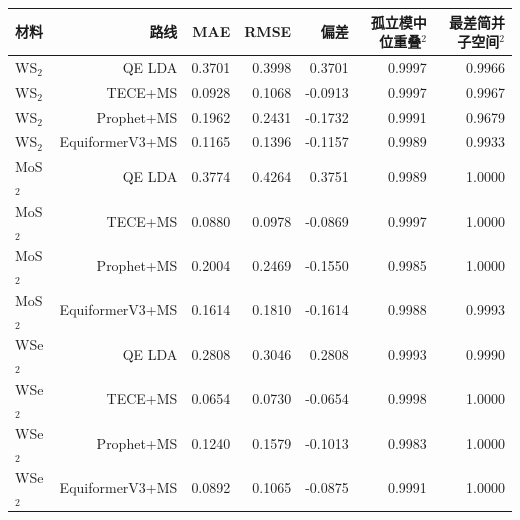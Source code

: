\begin{tabular}{lrrrrrr}
\toprule
材料 & 路线 & MAE & RMSE & 偏差 & 孤立模中位重叠$^2$ & 最差简并子空间$^2$ \\
\midrule
WS$_2$ & QE LDA & 0.3701 & 0.3998 & 0.3701 & 0.9997 & 0.9966 \\
WS$_2$ & TECE+MS & 0.0928 & 0.1068 & -0.0913 & 0.9997 & 0.9967 \\
WS$_2$ & Prophet+MS & 0.1962 & 0.2431 & -0.1732 & 0.9991 & 0.9679 \\
WS$_2$ & EquiformerV3+MS & 0.1165 & 0.1396 & -0.1157 & 0.9989 & 0.9933 \\
MoS$_2$ & QE LDA & 0.3774 & 0.4264 & 0.3751 & 0.9989 & 1.0000 \\
MoS$_2$ & TECE+MS & 0.0880 & 0.0978 & -0.0869 & 0.9997 & 1.0000 \\
MoS$_2$ & Prophet+MS & 0.2004 & 0.2469 & -0.1550 & 0.9985 & 1.0000 \\
MoS$_2$ & EquiformerV3+MS & 0.1614 & 0.1810 & -0.1614 & 0.9988 & 0.9993 \\
WSe$_2$ & QE LDA & 0.2808 & 0.3046 & 0.2808 & 0.9993 & 0.9990 \\
WSe$_2$ & TECE+MS & 0.0654 & 0.0730 & -0.0654 & 0.9998 & 1.0000 \\
WSe$_2$ & Prophet+MS & 0.1240 & 0.1579 & -0.1013 & 0.9983 & 1.0000 \\
WSe$_2$ & EquiformerV3+MS & 0.0892 & 0.1065 & -0.0875 & 0.9991 & 1.0000 \\
\bottomrule
\end{tabular}
